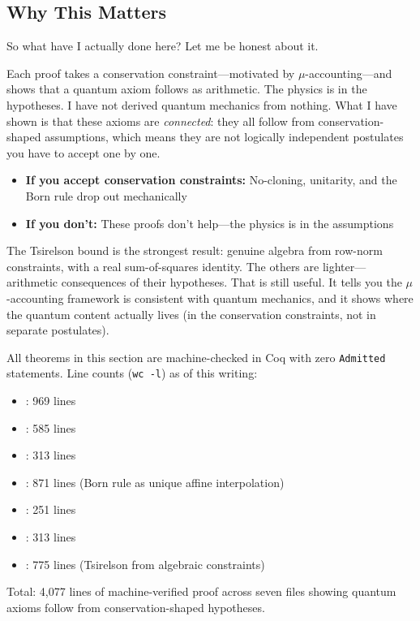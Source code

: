 \subsection{Why This Matters}

So what have I actually done here? Let me be honest about it.

Each proof takes a conservation constraint---motivated by $\mu$-accounting---and shows that a quantum axiom follows as arithmetic. The physics is in the hypotheses. I have not derived quantum mechanics from nothing. What I have shown is that these axioms are \textit{connected}: they all follow from conservation-shaped assumptions, which means they are not logically independent postulates you have to accept one by one.

\begin{itemize}
    \item \textbf{If you accept conservation constraints:} No-cloning, unitarity, and the Born rule drop out mechanically
    \item \textbf{If you don't:} These proofs don't help---the physics is in the assumptions
\end{itemize}

The Tsirelson bound is the strongest result: genuine algebra from row-norm constraints, with a real sum-of-squares identity. The others are lighter---arithmetic consequences of their hypotheses. That is still useful. It tells you the $\mu$-accounting framework is consistent with quantum mechanics, and it shows where the quantum content actually lives (in the conservation constraints, not in separate postulates).

\begin{tcolorbox}[colback=green!5!white,colframe=green!75!black,title=\textbf{Coq-Verified Quantum Axioms}]
All theorems in this section are machine-checked in Coq with zero \texttt{Admitted} statements. Line counts (\texttt{wc -l}) as of this writing:
\begin{itemize}
    \item {}: 969 lines
    \item {}: 585 lines
    \item {}: 313 lines
    \item {}: 871 lines (Born rule as unique affine interpolation)
    \item {}: 251 lines
    \item {}: 313 lines
    \item {}: 775 lines (Tsirelson from algebraic constraints)
\end{itemize}
Total: 4,077 lines of machine-verified proof across seven files showing quantum axioms follow from conservation-shaped hypotheses.
\end{tcolorbox}

